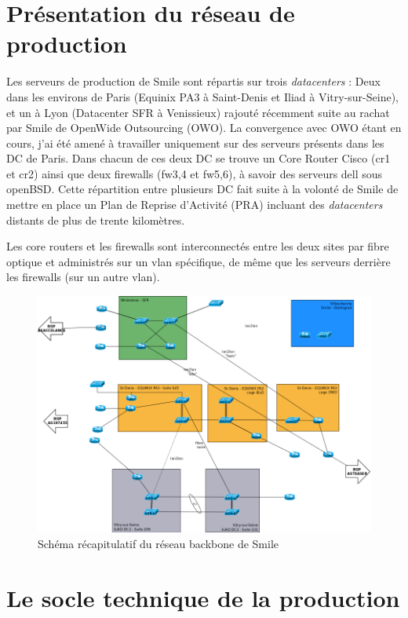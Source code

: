 \documentclass[14 pt,a4paper]{extreport}
\begin{document}
\section{Présentation du réseau de production}

Les serveurs de production de Smile sont répartis sur trois \emph{datacenters} : Deux dans les environs de Paris (Equinix PA3 à Saint-Denis et Iliad à Vitry-sur-Seine), et un à Lyon (Datacenter SFR à Venissieux) rajouté récemment suite au rachat par Smile de OpenWide Outsourcing (OWO). La convergence avec OWO étant en cours, j'ai été amené à travailler uniquement sur des serveurs présents dans les DC de Paris. Dans chacun de ces deux DC se trouve un Core Router Cisco (cr1 et cr2) ainsi que deux firewalls (fw3,4 et fw5,6), à savoir des serveurs dell sous openBSD. Cette répartition entre plusieurs DC fait suite à la volonté de Smile de mettre en place un Plan de Reprise d'Activité (PRA) incluant des \emph{datacenters} distants de plus de trente kilomètres.

Les core routers et les firewalls sont interconnectés entre les deux sites par fibre optique et administrés sur un vlan spécifique, de même que les serveurs derrière les firewalls (sur un autre vlan).

\begin{figure}[htp]
\centering
\includegraphics[scale=0.4]{reseau_backbone.png}
\caption{Schéma récapitulatif du réseau backbone de Smile}
\label{}
\end{figure}
\section{Le socle technique de la production}
\end{document}
